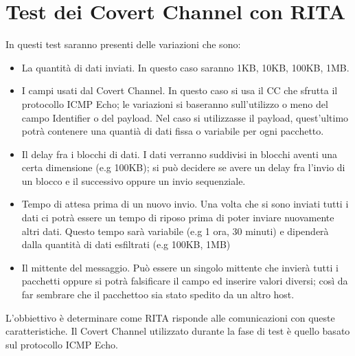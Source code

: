 \section{Test dei Covert Channel con RITA}
In questi test saranno presenti delle variazioni che sono: 
\begin{itemize} 
    \item La quantità di dati inviati. In questo caso saranno 1KB, 10KB, 100KB, 1MB. 
    \item I campi usati dal Covert Channel. In questo caso si usa il CC che sfrutta il protocollo ICMP Echo; 
    le variazioni si baseranno sull'utilizzo o meno del campo Identifier o del payload. 
    Nel caso si utilizzasse il payload, quest'ultimo potrà contenere una quantià di dati fissa o variabile per ogni pacchetto. 
    \item Il delay fra i blocchi di dati. I dati verranno suddivisi in blocchi aventi una certa dimensione (e.g 100KB); 
    si può decidere se avere un delay fra l'invio di un blocco e il successivo oppure un invio sequenziale. 
    \item Tempo di attesa prima di un nuovo invio. Una volta che si sono inviati tutti i dati ci potrà essere un tempo di riposo 
    prima di poter inviare nuovamente altri dati. Questo tempo sarà variabile (e.g 1 ora, 30 minuti) e 
    dipenderà dalla quantità di dati esfiltrati (e.g 100KB, 1MB) 
    \item Il mittente del messaggio. Può essere un singolo mittente che invierà tutti i pacchetti oppure si potrà 
    falsificare il campo ed inserire valori diversi; così da far sembrare che il pacchettoo sia stato spedito da un altro host. 
\end{itemize} 
L'obbiettivo è determinare come RITA risponde alle comunicazioni con queste caratteristiche. 
Il Covert Channel utilizzato durante la fase di test è quello basato sul protocollo ICMP Echo. 

